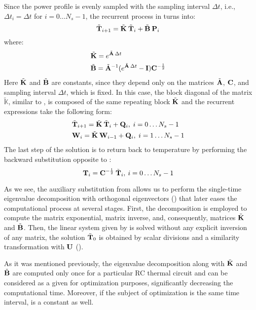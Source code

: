 Since the power profile is evenly sampled with the sampling interval $\Delta t$, i.e., $\Delta t_i = \Delta t$ for $i = 0 \dots N_s - 1$, the recurrent process in  turns into:
\[
  \tilde{\mathbf{T}}_{i+1} = \tilde{\mathbf{K}} \: \tilde{\mathbf{T}}_i + \tilde{\mathbf{B}} \: \mathbf{P}_i
\]
where:
\begin{align*}
  & \tilde{\mathbf{K}} = e^{\tilde{\mathbf{A}} \: \Delta t} \\
  & \tilde{\mathbf{B}} = \tilde{\mathbf{A}}^{-1} ( e^{\tilde{\mathbf{A}} \: \Delta t} - \mathbf{I} ) \mathbf{C}^{-\frac{1}{2}}
\end{align*}
Here $\tilde{\mathbf{K}}$ and $\tilde{\mathbf{B}}$ are constants, since they depend only on the matrices $\tilde{\mathbf{A}}$, $\mathbf{C}$, and sampling interval $\Delta t$, which is fixed. In this case, the block diagonal of the matrix $\tilde{\mathbb{K}}$, similar to , is composed of the same repeating block $\tilde{\mathbf{K}}$ and the recurrent expressions take the following form:
\begin{align}
  & \tilde{\mathbf{T}}_{i + 1} = \tilde{\mathbf{K}} \: \tilde{\mathbf{T}}_i + \mathbf{Q}_i, \; i = 0 \dots N_s - 1 \nonumber \\
  & \mathbf{W}_i = \tilde{\mathbf{K}} \: \mathbf{W}_{i - 1} + \mathbf{Q}_i, \; i = 1 \dots N_s - 1 \nonumber
\end{align}
The last step of the solution is to return back to temperature by performing the backward substitution opposite to :
\[
  \mathbf{T}_i = \mathbf{C}^{-\frac{1}{2}} \: \tilde{\mathbf{T}}_i, \: i = 0 \dots N_s - 1
\]

As we see, the auxiliary substitution from  allows us to perform the single-time eigenvalue decomposition with orthogonal eigenvectors () that later eases the computational process at several stages. First, the decomposition is employed to compute the matrix exponential, matrix inverse, and, consequently, matrices $\tilde{\mathbf{K}}$ and $\tilde{\mathbf{B}}$. Then, the linear system given by  is solved without any explicit inversion of any matrix, the solution $\tilde{\mathbf{T}}_0$ is obtained by scalar divisions and a similarity transformation with $\mathbf{U}$ ().

As it was mentioned previously, the eigenvalue decomposition along with $\tilde{\mathbf{K}}$ and $\tilde{\mathbf{B}}$ are computed only once for a particular RC thermal circuit and can be considered as a given for optimization purposes, significantly decreasing the computational time. Moreover, if the subject of optimization is the same time interval,  is a constant as well.
